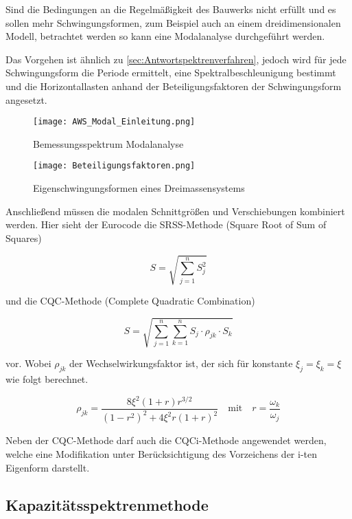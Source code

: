 Sind die Bedingungen an die Regelmäßigkeit des Bauwerks nicht erfüllt und es sollen mehr Schwingungsformen, zum Beispiel auch an einem dreidimensionalen Modell, betrachtet werden so kann eine Modalanalyse durchgeführt werden.

Das Vorgehen ist ähnlich zu \cref{sec:Antwortspektrenverfahren}, jedoch wird für jede Schwingungsform die Periode ermittelt, eine Spektralbeschleunigung bestimmt und die Horizontallasten anhand der Beteiligungsfaktoren der Schwingungsform angesetzt.

\begin{figure}[H]
    \centering
    \texttt{[image: AWS\_Modal\_Einleitung.png]}
    \caption{Bemessungsspektrum Modalanalyse}
\end{figure}

\begin{figure}[H]
    \centering
    \texttt{[image: Beteiligungsfaktoren.png]}
    \caption{Eigenschwingungsformen eines Dreimassensystems \cite{Pocanschi}}
\end{figure}

Anschließend müssen die modalen Schnittgrößen und Verschiebungen kombiniert werden. Hier sieht der Eurocode die SRSS-Methode (Square Root of Sum of Squares)

\begin{equation*}
S = \sqrt{\sum_{j=1}^{n}S_j^2}
\end{equation*}

und die CQC-Methode (Complete Quadratic Combination)

\begin{equation*}
S = \sqrt{\sum_{j=1}^{n}\sum_{k=1}^{n} S_j \cdot \rho_{jk} \cdot S_k}
\end{equation*}

vor. Wobei $\rho_{jk}$ der Wechselwirkungsfaktor ist, der sich für konstante $\xi_j = \xi_k = \xi$ wie folgt berechnet.

\begin{equation*}
\rho_{jk} = \frac{8 \xi^2 (1 + r) r^{3/2}}{(1 - r^2)^2 + 4 \xi^2 r ( 1 + r)^2}
\quad\mathrm{mit}\quad 
r = \frac{\omega_k}{\omega_j}
\end{equation*}

Neben der CQC-Methode darf auch die CQCi-Methode angewendet werden, welche eine Modifikation unter Berücksichtigung des Vorzeichens der i-ten Eigenform darstellt.



\subsection{Kapazitätsspektrenmethode}
\label{sec:Kapazitaetsspektrenmethode}

